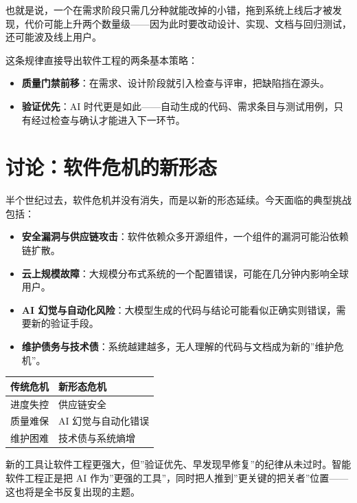 \documentclass[
]{ctexbook}
\providecommand{\tightlist}{\setlength{\itemsep}{0pt}\setlength{\parskip}{0pt} }
\newcounter{none}
\begin{document}
也就是说，一个在需求阶段只需几分种就能改掉的小错，拖到系统上线后才被发现，代价可能上升两个数量级------因为此时要改动设计、实现、文档与回归测试，还可能波及线上用户。

这条规律直接导出软件工程的两条基本策略：

\begin{itemize}
\tightlist
\item
  \textbf{质量门禁前移}：在需求、设计阶段就引入检查与评审，把缺陷挡在源头。
\item
  \textbf{验证优先}：AI
  时代更是如此------自动生成的代码、需求条目与测试用例，只有经过检查与确认才能进入下一环节。
\end{itemize}

\section{讨论：软件危机的新形态}\label{ux8ba8ux8bbaux8f6fux4ef6ux5371ux673aux7684ux65b0ux5f62ux6001}

半个世纪过去，软件危机并没有消失，而是以新的形态延续。今天面临的典型挑战包括：

\begin{itemize}
\tightlist
\item
  \textbf{安全漏洞与供应链攻击}：软件依赖众多开源组件，一个组件的漏洞可能沿依赖链扩散。
\item
  \textbf{云上规模故障}：大规模分布式系统的一个配置错误，可能在几分钟内影响全球用户。
\item
  \textbf{AI
  幻觉与自动化风险}：大模型生成的代码与结论可能看似正确实则错误，需要新的验证手段。
\item
  \textbf{维护债务与技术债}：系统越建越多，无人理解的代码与文档成为新的''维护危机''。
\end{itemize}

{\def\LTcaptype{none} %
\begin{longtable}[]{@{}ll@{}}
\toprule\noalign{}
传统危机 & 新形态危机 \\
\midrule\noalign{}
\endhead
\bottomrule\noalign{}
\endlastfoot
进度失控 & 供应链安全 \\
质量难保 & AI 幻觉与自动化错误 \\
维护困难 & 技术债与系统熵增 \\
\end{longtable}
}

新的工具让软件工程更强大，但''验证优先、早发现早修复''的纪律从未过时。智能软件工程正是把
AI
作为''更强的工具''，同时把人推到''更关键的把关者''位置------这也将是全书反复出现的主题。
\end{document}
